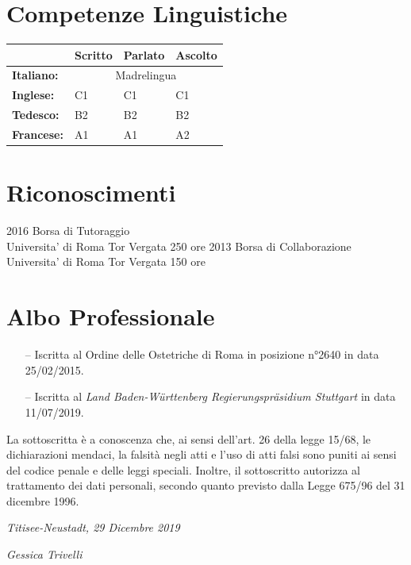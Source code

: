 \documentclass[11pt]{friggeri-cv}
\begin{document}
\section{Competenze Linguistiche}
\begin{table}[!h]
  \centering
  \renewcommand{\arraystretch}{1.45}
  \begin{tabular}{ p{3cm} p{3cm} p{3cm} p{3cm} }
    \hline
    & \textbf{Scritto}  & \textbf{Parlato} & \textbf{Ascolto}     \\     \hline
    \textbf{Italiano:}  & \multicolumn{3}{c}{Madrelingua}         \\
    \textbf{Inglese:}   & C1 & C1 & C1                            \\ 
    \textbf{Tedesco:}   & B2 & B2 & B2                            \\ 
    \textbf{Francese:}  & A1 & A1 & A2                            \\    \hline
  \end{tabular}
\end{table}

\section{Riconoscimenti}
\begin{entrylist}
  \entry
    {2016}
    {Borsa di Tutoraggio}
    {\\Universita' di Roma Tor Vergata}
    {250 ore}
  \entry
    {2013}
    {Borsa di Collaborazione}
    {\\Universita' di Roma Tor Vergata}
    {150 ore}
\end{entrylist}

\vspace{-10pt}
\section{Albo Professionale}
\begin{itemize}
  \item[--] Iscritta al Ordine delle Ostetriche di Roma in posizione 
  n°2640 in data 25/02/2015.
  \item[--] Iscritta al \emph{Land Baden-W{\"u}rttenberg 
  Regierungspr{\"a}sidium Stuttgart} in data 11/07/2019.
\end{itemize}

\vspace{75pt}
\footnotesize La sottoscritta è a conoscenza che, ai sensi dell’art. 26 della legge 
15/68, le dichiarazioni mendaci, la falsità negli atti e l’uso di
atti falsi sono puniti ai sensi del codice penale e delle leggi speciali. Inoltre, il 
sottoscritto autorizza al trattamento dei dati
personali, secondo quanto previsto dalla Legge 675/96 del 31 dicembre 1996.

\vspace{75pt}
\begin{flushleft}
\large\emph{Titisee-Neustadt, 29 Dicembre 2019}
\end{flushleft}
\begin{flushright}
\large\emph{Gessica Trivelli}
\end{flushright}
\end{document}
